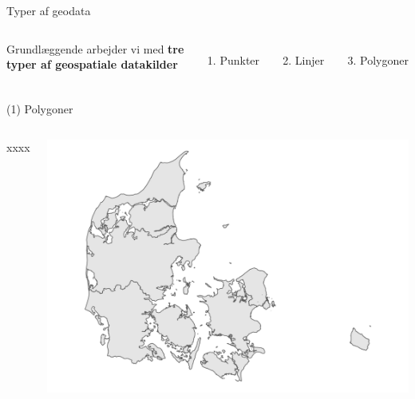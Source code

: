 \documentclass[
  8pt,
  ignorenonframetext,
  aspectratio=169]{beamer}
\providecommand{\tightlist}{%
  \setlength{\itemsep}{0pt}\setlength{\parskip}{0pt}}
\newcommand{\columnsbegin}{\begin{columns}}
\newcommand{\columnsend}{\end{columns}}
\begin{document}
\begin{frame}{Typer af geodata}
\protect\hypertarget{typer-af-geodata}{}
\columnsbegin
{}

Grundlæggende arbejder vi med \textbf{tre typer af geospatiale
datakilder}

\begin{enumerate}
\tightlist
\item
  Punkter
\end{enumerate}

\bigskip
\bigskip

\begin{enumerate}
\setcounter{enumi}{1}
\tightlist
\item
  Linjer
\end{enumerate}

\bigskip
\bigskip

\begin{enumerate}
\setcounter{enumi}{2}
\tightlist
\item
  Polygoner
\end{enumerate}


\columnsend
\end{frame}

\begin{frame}{(1) Polygoner}
\protect\hypertarget{polygoner}{}
\columnsbegin
{}

xxxx


\includegraphics[width=1\linewidth]{crashcourse_slides_files/figure-beamer/unnamed-chunk-6-1}

\columnsend
\end{frame}
\end{document}

